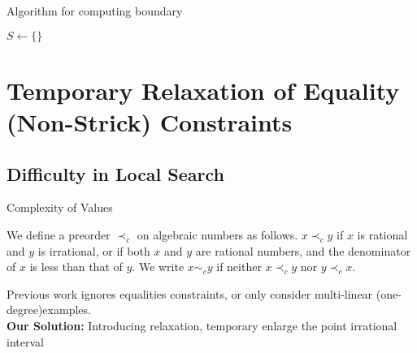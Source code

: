 \begin{frame}{Algorithm for computing boundary}
    \begin{algorithm}[H]
        \SetAlgoLined
    $S \leftarrow \{\}$ 
    \end{algorithm}
\end{frame}

\section{Temporary Relaxation of Equality (Non-Strick) Constraints}

\subsection{Difficulty in Local Search}

\begin{frame}{Complexity of Values}
    \begin{definition}
        We define a preorder $\prec_c$ on algebraic numbers as follows. $x\prec_c y$ if $x$ is rational and $y$ is irrational, or if both $x$ and $y$ are rational numbers, and the denominator of $x$ is less than that of $y$. We write $x \sim_c y$ if neither $x\prec_c y$ nor $y\prec_c x$.
    \end{definition}
    Previous work  ignores equalities constraints, or only consider multi-linear (one-degree)examples.\\

    \textbf{Our Solution:} Introducing relaxation, temporary enlarge the point irrational interval
\end{frame}

